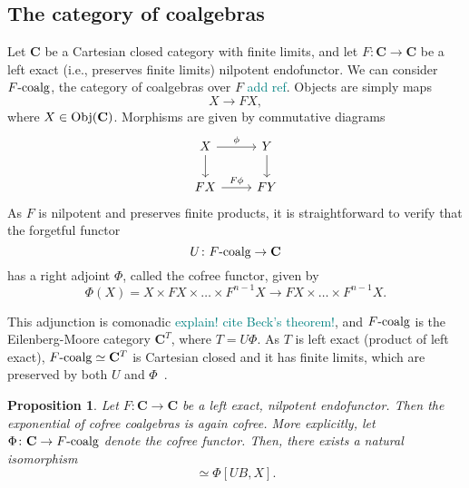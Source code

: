 \documentclass[12pt]{article}
\newtheorem{proposition}{Proposition}
\newcommand{\pietro}[1]{\textcolor{teal}{#1}}
\newcommand{\Obj}{{\textnormal{Obj}}}
\newcommand{\Cat}{{\mathbf{C}}}
\newcommand{\FCoalg}{{F\textnormal{-coalg}}}
\begin{document}
\subsection{The category of coalgebras}

Let $\Cat$ be a Cartesian closed category with finite limits, and let $F\colon \Cat \rightarrow \Cat$ be a left exact (i.e., preserves finite limits) nilpotent endofunctor. We can consider $\FCoalg$, the category of coalgebras over $F$ \pietro{add ref}. Objects are simply maps
\begin{equation*}
    X \rightarrow F X,
\end{equation*}
where $X \in \Obj(\Cat)$. Morphisms are given by commutative diagrams
\begin{equation*}
    \begin{tikzcd}
        X \arrow[rightarrow]{d} \arrow[rightarrow]{r}{\phi}
        & Y \arrow[rightarrow]{d} \\
        FX \arrow[rightarrow]{r}{F \phi}
        & FY
    \end{tikzcd}
\end{equation*}
As $F$ is nilpotent and preserves finite products, it is straightforward to verify that the forgetful functor
\begin{equation*}
    U \colon \FCoalg \rightarrow \Cat
\end{equation*}
has a right adjoint $\Phi$, called the cofree functor, given by
\begin{equation*}
    \Phi(X) = X \times F X \times \dots \times F^{n-1} X \rightarrow F X \times \dots \times F^{n-1} X.
\end{equation*}

This adjunction is comonadic \pietro{explain! cite Beck's theorem!}, and $\FCoalg$ is the Eilenberg-Moore category $\Cat^T$, where $T = U\Phi$. As $T$ is left exact (product of left exact), $\FCoalg \simeq \Cat^T$ is Cartesian closed and it has finite limits, which are preserved by both $U$ and $\Phi$~\cite[Sect.~5.50]{wyler1991lecture}.

\begin{proposition}\label{prop:cofree_exponentiating}
    Let $F\colon \Cat \rightarrow \Cat$ be a left exact, nilpotent endofunctor. Then the exponential of cofree coalgebras is again cofree.
    More explicitly, let $\Phi\colon \Cat \rightarrow \FCoalg$ denote the cofree functor. Then, there exists a natural isomorphism
    \begin{equation*}
        [B, \Phi X] \simeq \Phi[UB, X].
    \end{equation*}
\end{proposition}
\end{document}
